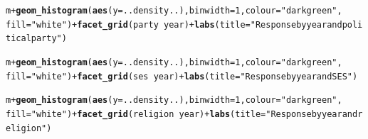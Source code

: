 \documentclass[11pt,letter]{article}\usepackage[]{graphicx}\usepackage[]{color}
\makeatletter
\newcommand{\hlnum}[1]{\textcolor[rgb]{0.686,0.059,0.569}{#1}}%
\newcommand{\hlstr}[1]{\textcolor[rgb]{0.192,0.494,0.8}{#1}}%
\newcommand{\hlopt}[1]{\textcolor[rgb]{0,0,0}{#1}}%
\newcommand{\hlstd}[1]{\textcolor[rgb]{0.345,0.345,0.345}{#1}}%
\newcommand{\hlkwc}[1]{\textcolor[rgb]{0.333,0.667,0.333}{#1}}%
\newcommand{\hlkwd}[1]{\textcolor[rgb]{0.737,0.353,0.396}{\textbf{#1}}}%
\newenvironment{kframe}{%
 \def\at@end@of@kframe{}%
 \ifinner\ifhmode%
  \def\at@end@of@kframe{\end{minipage}}%
  \begin{minipage}{\columnwidth}%
 \fi\fi%
 \def\FrameCommand##1{\hskip\@totalleftmargin \hskip-\fboxsep
 \colorbox{shadecolor}{##1}\hskip-\fboxsep
     \hskip-\linewidth \hskip-\@totalleftmargin \hskip\columnwidth}%
 \MakeFramed {\advance\hsize-\width
   \@totalleftmargin\z@ \linewidth\hsize
   \@setminipage}}%
 {\par\unskip\endMakeFramed%
 \at@end@of@kframe}
\newenvironment{knitrout}{}{} %
\makeatother
\begin{document}
\begin{knitrout}
\begin{kframe}
\begin{alltt}
\hlstd{m} \hlopt{+} \hlkwd{geom_histogram}\hlstd{(}\hlkwd{aes}\hlstd{(}\hlkwc{y} \hlstd{= ..density..),} \hlkwc{binwidth} \hlstd{=} \hlnum{1}\hlstd{,} \hlkwc{colour} \hlstd{=} \hlstr{"darkgreen"}\hlstd{,}
    \hlkwc{fill} \hlstd{=} \hlstr{"white"}\hlstd{)} \hlopt{+} \hlkwd{facet_grid}\hlstd{(party} \hlopt{~} \hlstd{year)} \hlopt{+} \hlkwd{labs}\hlstd{(}\hlkwc{title} \hlstd{=} \hlstr{"Response by year and political party"}\hlstd{)}

\hlstd{m} \hlopt{+} \hlkwd{geom_histogram}\hlstd{(}\hlkwd{aes}\hlstd{(}\hlkwc{y} \hlstd{= ..density..),} \hlkwc{binwidth} \hlstd{=} \hlnum{1}\hlstd{,} \hlkwc{colour} \hlstd{=} \hlstr{"darkgreen"}\hlstd{,}
    \hlkwc{fill} \hlstd{=} \hlstr{"white"}\hlstd{)} \hlopt{+} \hlkwd{facet_grid}\hlstd{(ses} \hlopt{~} \hlstd{year)} \hlopt{+} \hlkwd{labs}\hlstd{(}\hlkwc{title} \hlstd{=} \hlstr{"Response by year and SES"}\hlstd{)}

\hlstd{m} \hlopt{+} \hlkwd{geom_histogram}\hlstd{(}\hlkwd{aes}\hlstd{(}\hlkwc{y} \hlstd{= ..density..),} \hlkwc{binwidth} \hlstd{=} \hlnum{1}\hlstd{,} \hlkwc{colour} \hlstd{=} \hlstr{"darkgreen"}\hlstd{,}
    \hlkwc{fill} \hlstd{=} \hlstr{"white"}\hlstd{)} \hlopt{+} \hlkwd{facet_grid}\hlstd{(religion} \hlopt{~} \hlstd{year)} \hlopt{+} \hlkwd{labs}\hlstd{(}\hlkwc{title} \hlstd{=} \hlstr{"Response by year and religion"}\hlstd{)}
\end{alltt}
\end{kframe}
\end{knitrout}

\newpage
\end{document}
